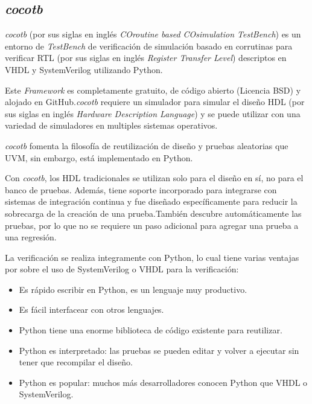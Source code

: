 
\subsection{\textit{cocotb}}
\textit{cocotb} (por sus siglas en inglés \textit{COroutine based COsimulation
TestBench}) es un entorno de \textit{TestBench} de verificación de simulación
basado en corrutinas para verificar RTL (por sus siglas en inglés
\textit{Register Transfer Level}) descriptos en VHDL y SystemVerilog utilizando
Python.

Este \textit{Framework} es completamente gratuito, de código abierto (Licencia
BSD) y alojado en GitHub.\textit{cocotb} requiere un simulador para simular el
diseño HDL (por sus siglas en inglés \textit{Hardware Description Language}) y
se puede utilizar con una variedad de simuladores en multiples sistemas
operativos.

\textit{cocotb} fomenta la filosofía de reutilización de diseño y pruebas
aleatorias que UVM, sin embargo, está implementado en Python.

Con \textit{cocotb}, los HDL tradicionales se utilizan solo para el diseño en
sí, no para el banco de pruebas. Además, tiene soporte incorporado para
integrarse con sistemas de integración continua y fue diseñado específicamente
para reducir la sobrecarga de la creación de una prueba.También descubre
automáticamente las pruebas, por lo que no se requiere un paso adicional para
agregar una prueba a una regresión.

La verificación se realiza integramente con Python, lo cual tiene varias
ventajas por sobre el uso de SystemVerilog o VHDL para la verificación:

\begin{itemize}
  \item Es rápido escribir en Python, es un lenguaje muy productivo.
  \item Es fácil interfacear con otros lenguajes.
  \item Python tiene una enorme biblioteca de código existente para reutilizar.
  \item Python es interpretado: las pruebas se pueden editar y volver a ejecutar
  sin tener que recompilar el diseño.
  \item Python es popular: muchos más desarrolladores conocen Python que
  VHDL o SystemVerilog.
\end{itemize}

